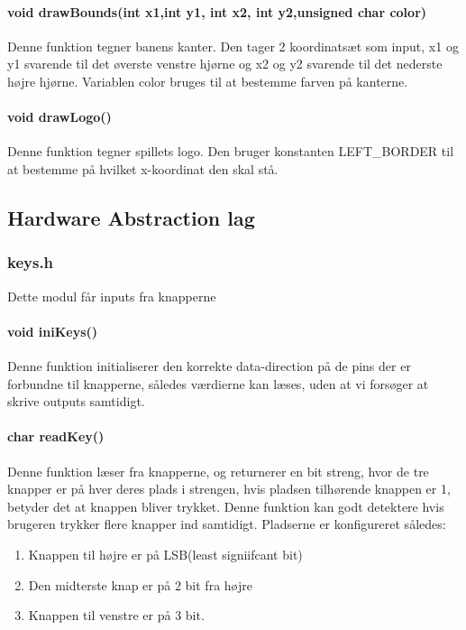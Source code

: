\paragraph{void drawBounds(int x1,int y1, int x2, int y2,unsigned char color)}
Denne funktion tegner banens kanter. Den tager 2 koordinatsæt som input, x1 og y1 svarende til det øverste venstre hjørne og  x2 og y2 svarende til det nederste højre hjørne. Variablen color bruges til at bestemme farven på kanterne. 

\paragraph{void drawLogo()}
Denne funktion tegner spillets logo. Den bruger konstanten LEFT\_BORDER til at bestemme på hvilket x-koordinat den skal stå. 

\subsection{Hardware Abstraction lag}
\subsubsection{keys.h}
Dette modul får inputs fra knapperne 
\paragraph{void iniKeys()}
Denne funktion initialiserer den korrekte data-direction på de pins der er forbundne til knapperne, således værdierne kan læses, uden at vi forsøger at skrive outputs samtidigt.

\paragraph{char readKey()}
Denne funktion læser fra knapperne, og returnerer en bit streng, hvor de tre knapper er på hver deres plads i strengen, hvis pladsen tilhørende knappen er 1, betyder det at knappen bliver trykket. Denne funktion kan godt detektere hvis brugeren trykker flere knapper ind samtidigt. Pladserne er konfigureret således:
\begin{enumerate}
\item Knappen til højre er på LSB(least signiifcant bit)
\item Den midterste knap er på 2 bit fra højre
\item Knappen til venstre er på 3 bit.
\end{enumerate}

